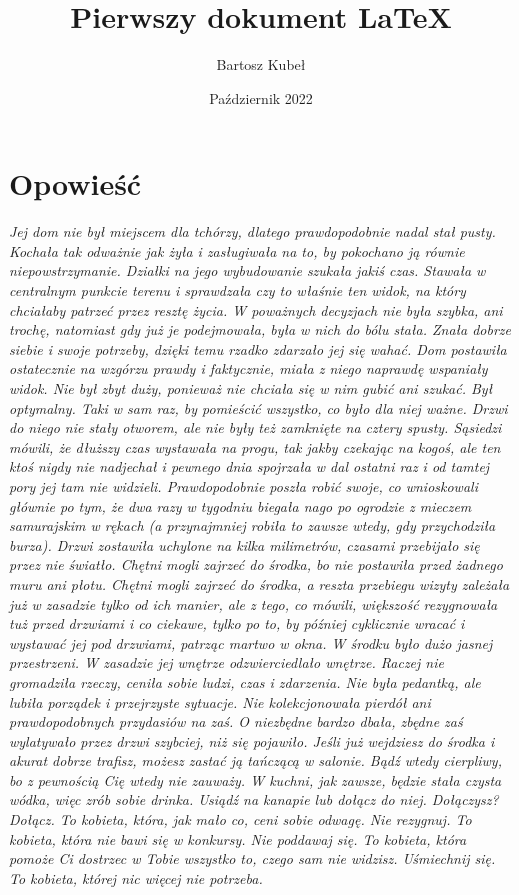 \documentclass[12pt, letterpaper, titlepage]{article}
\title{Pierwszy dokument LaTeX}
\author{Bartosz Kubeł}
\date{Październik 2022}
\begin{document}
\maketitle
\section{Opowieść} \begin{center}
\textit{Jej dom nie był miejscem dla tchórzy, dlatego prawdopodobnie nadal stał pusty. Kochała tak odważnie jak żyła i zasługiwała na to, by pokochano ją równie niepowstrzymanie. Działki na jego wybudowanie szukała jakiś czas. Stawała w centralnym punkcie terenu i sprawdzała czy to właśnie ten widok, na który chciałaby patrzeć przez resztę życia. W poważnych decyzjach nie była szybka, ani trochę, natomiast gdy już je podejmowała, była w nich do bólu stała. Znała dobrze siebie i swoje potrzeby, dzięki temu rzadko zdarzało jej się wahać. Dom postawiła ostatecznie na wzgórzu prawdy i faktycznie, miała z niego naprawdę wspaniały widok. Nie był zbyt duży, ponieważ nie chciała się w nim gubić ani szukać. Był optymalny. Taki w sam raz, by pomieścić wszystko, co było dla niej ważne. Drzwi do niego nie stały otworem, ale nie były też zamknięte na cztery spusty. Sąsiedzi mówili, że dłuższy czas wystawała na progu, tak jakby czekając na kogoś, ale ten ktoś nigdy nie nadjechał i pewnego dnia spojrzała w dal ostatni raz i od tamtej pory jej tam nie widzieli. Prawdopodobnie poszła robić swoje, co wnioskowali głównie po tym, że dwa razy w tygodniu biegała nago po ogrodzie z mieczem samurajskim w rękach (a przynajmniej robiła to zawsze wtedy, gdy przychodziła burza). Drzwi zostawiła uchylone na kilka milimetrów, czasami przebijało się przez nie światło. Chętni mogli zajrzeć do środka, bo nie postawiła przed żadnego muru ani płotu. Chętni mogli zajrzeć do środka, a reszta przebiegu wizyty zależała już w zasadzie tylko od ich manier, ale z tego, co mówili, większość rezygnowała tuż przed drzwiami i co ciekawe, tylko po to, by później cyklicznie wracać i wystawać jej pod drzwiami, patrząc martwo w okna. W środku było dużo jasnej przestrzeni. W zasadzie jej wnętrze odzwierciedlało wnętrze. Raczej nie gromadziła rzeczy, ceniła sobie ludzi, czas i zdarzenia. Nie była pedantką, ale lubiła porządek i przejrzyste sytuacje. Nie kolekcjonowała pierdół ani prawdopodobnych przydasiów na zaś. O niezbędne bardzo dbała, zbędne zaś wylatywało przez drzwi szybciej, niż się pojawiło. Jeśli już wejdziesz do środka i akurat dobrze trafisz, możesz zastać ją tańczącą w salonie. Bądź wtedy cierpliwy, bo z pewnością Cię wtedy nie zauważy. W kuchni, jak zawsze, będzie stała czysta wódka, więc zrób sobie drinka. Usiądź na kanapie lub dołącz do niej. Dołączysz? Dołącz. To kobieta, która, jak mało co, ceni sobie odwagę. Nie rezygnuj. To kobieta, która nie bawi się w konkursy. Nie poddawaj się. To kobieta, która pomoże Ci dostrzec w Tobie wszystko to, czego sam nie widzisz. Uśmiechnij się. To kobieta, której nic więcej nie potrzeba.}
\end{center}
\end{document}
